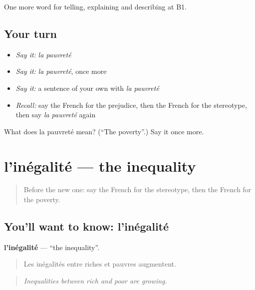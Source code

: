 \begin{grammarlens}[title={What you've built}]
One more word for telling, explaining and describing at B1.
\end{grammarlens}

\subsection*{Your turn}
\begin{itemize}
\raggedright
  \item \emph{Say it:} \emph{la pauvreté}
  \item \emph{Say it:} \emph{la pauvreté}, once more
  \item \emph{Say it:} a sentence of your own with \emph{la pauvreté}
  \item \emph{Recall:} say the French for the prejudice, then the French for the stereotype, then say \emph{la pauvreté} again
\end{itemize}

\begin{tcolorbox}[breakable,colback=teal!4,colframe=teal!35!black,title={Before you move on}]
What does la pauvreté mean? (\textquotedblleft{}The poverty\textquotedblright{}.) Say it once more.
\end{tcolorbox}
\section[l'inégalité]{l'inégalité — the inequality}

\label{lesson:FR-C365-inegalite}



\begin{quote}
Before the new one: say the French for the stereotype, then the French for the poverty.
\end{quote}

\subsection*{You'll want to know: l'inégalité}
\textbf{l'inégalité} — \textquotedblleft{}the inequality\textquotedblright{}.

\begin{quote}
Les inégalités entre riches et pauvres augmentent.
\end{quote}

\begin{quote}
\emph{Inequalities between rich and poor are growing.}
\end{quote}

